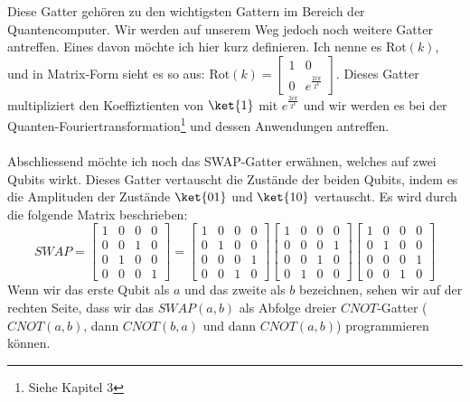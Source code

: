 Diese Gatter gehören zu den wichtigsten Gattern im Bereich der Quantencomputer. Wir werden auf unserem Weg jedoch noch weitere Gatter antreffen. Eines davon möchte ich hier kurz definieren. Ich nenne es $\text{Rot}(k)$, und in Matrix-Form sieht es so aus: $\text{Rot}(k) = \begin{bmatrix}1 & 0 \\ 0 & e^{\frac{2i\pi}{2^k}}\end{bmatrix}$. Dieses Gatter multipliziert den Koeffiztienten von $\ket{1}$ mit $e^{\frac{2i\pi}{2^k}}$ und wir werden es bei der Quanten-Fouriertransformation\footnote{Siehe Kapitel 3} und dessen Anwendungen antreffen.

\paragraph{}

Abschliessend möchte ich noch das SWAP-Gatter erwähnen, welches auf zwei Qubits wirkt. Dieses Gatter vertauscht die Zustände der beiden Qubits, indem es die Amplituden der Zustände $\ket{01}$ und $\ket{10}$ vertauscht. Es wird durch die folgende Matrix beschrieben: $$ SWAP = \begin{bmatrix} 1 & 0 & 0 & 0 \\ 0 & 0 & 1 & 0 \\ 0 & 1 & 0 & 0 \\ 0 & 0 & 0 & 1 \end{bmatrix} = \begin{bmatrix}1 & 0 & 0 & 0 \\ 0 & 1 & 0 & 0 \\ 0 & 0 & 0 & 1 \\ 0 & 0 & 1 & 0\end{bmatrix} \begin{bmatrix}1 & 0 & 0 & 0 \\ 0 & 0 & 0 & 1 \\ 0 & 0 & 1 & 0 \\ 0 & 1 & 0 & 0 \end{bmatrix} \begin{bmatrix}1 & 0 & 0 & 0 \\ 0 & 1 & 0 & 0 \\ 0 & 0 & 0 & 1 \\ 0 & 0 & 1 & 0\end{bmatrix}$$
Wenn wir das erste Qubit als $a$ und das zweite als $b$ bezeichnen, sehen wir auf der rechten Seite, dass wir das $SWAP(a, b)$ als Abfolge dreier $CNOT$-Gatter ($CNOT(a, b)$, dann $CNOT(b, a)$ und dann $CNOT(a, b)$) programmieren können.
